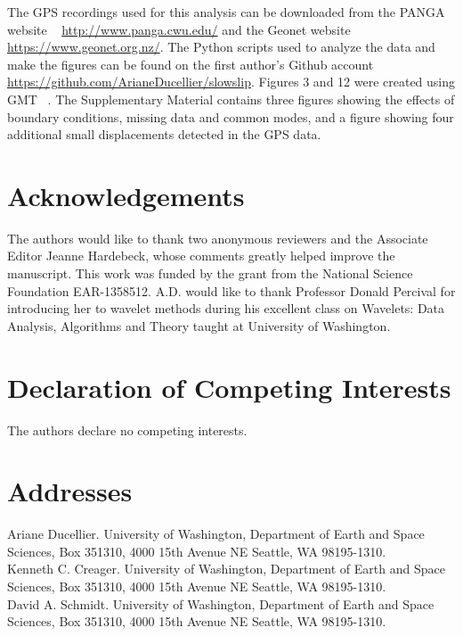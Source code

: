 \documentclass{article}
\begin{document}
The GPS recordings used for this analysis can be downloaded from the PANGA website ~\citep{PANGA} \url{http://www.panga.cwu.edu/} and the Geonet website \url{https://www.geonet.org.nz/}. The Python scripts used to analyze the data and make the figures can be found on the first author's Github account \url{https://github.com/ArianeDucellier/slowslip}. Figures 3 and 12 were created using GMT ~\citep{WES_1991}. The Supplementary Material contains three figures showing the effects of boundary conditions, missing data and common modes, and a figure showing four additional small displacements detected in the GPS data.

\section*{Acknowledgements}

The authors would like to thank two anonymous reviewers and the Associate Editor Jeanne Hardebeck, whose comments greatly helped improve the manuscript. This work was funded by the grant from the National Science Foundation EAR-1358512. A.D. would like to thank Professor Donald Percival for introducing her to wavelet methods during his excellent class on Wavelets: Data Analysis, Algorithms and Theory taught at University of Washington.   

\section*{Declaration of Competing Interests}

The authors declare no competing interests.




\newpage

\section*{Addresses}

Ariane Ducellier. University of Washington, Department of Earth and Space Sciences, Box 351310, 4000 15th Avenue NE Seattle, WA 98195-1310. \\

Kenneth C. Creager. University of Washington, Department of Earth and Space Sciences, Box 351310, 4000 15th Avenue NE Seattle, WA 98195-1310. \\

David A. Schmidt. University of Washington, Department of Earth and Space Sciences, Box 351310, 4000 15th Avenue NE Seattle, WA 98195-1310.
\end{document}

